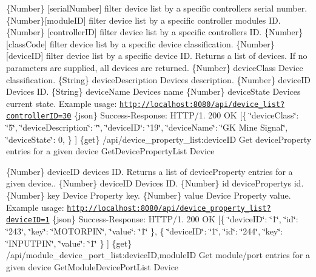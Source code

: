 \{Number\} \mbox{[}serial\+Number\mbox{]} filter device list by a specific controller\textquotesingle{}s serial number.  \{Number\}\mbox{[}module\+ID\mbox{]} filter device list by a specific controller module\textquotesingle{}s ID.  \{Number\} \mbox{[}controller\+ID\mbox{]} filter device list by a specific controller\textquotesingle{}s ID.  \{Number\} \mbox{[}class\+Code\mbox{]} filter device list by a specific device classification.  \{Number\} \mbox{[}device\+ID\mbox{]} filter device list by a specific device ID.  Returns a list of devices. If no parameters are supplied, all devices are returned.  \{Number\} device\+Class Device classification.  \{String\} device\+Description Device\textquotesingle{}s description.  \{Number\} device\+ID Device\textquotesingle{}s ID.  \{String\} device\+Name Device\textquotesingle{}s name  \{Number\} device\+State Device\textquotesingle{}s current state.  Example usage\+: \href{http://localhost:8080/api/device_list?controllerID=30}{\tt http\+://localhost\+:8080/api/device\+\_\+list?controller\+I\+D=30}  \{json\} Success-\/\+Response\+: H\+T\+T\+P/1. 200 OK \mbox{[}\{ \char`\"{}device\+Class\char`\"{}\+: \char`\"{}5\char`\"{}, \char`\"{}device\+Description\char`\"{}\+: \char`\"{}\char`\"{}, \char`\"{}device\+I\+D\char`\"{}\+: \char`\"{}19\char`\"{}, \char`\"{}device\+Name\char`\"{}\+: \char`\"{}\+G\+K Mine Signal\char`\"{}, \char`\"{}device\+State\char`\"{}\+: 0, \} \mbox{]}  \{get\} /api/device\+\_\+property\+\_\+list\+:device\+ID Get device\+Property entries for a given device  Get\+Device\+Property\+List  Device

\{Number\} device\+ID device\textquotesingle{}s ID.  Returns a list of device\+Property entries for a given device..  \{Number\} device\+ID Device\textquotesingle{}s ID.  \{Number\} id device\+Property\textquotesingle{}s id.  \{Number\} key Device Property key.  \{Number\} value Device Property value.  Example usage\+: \href{http://localhost:8080/api/device_property_list?deviceID=1}{\tt http\+://localhost\+:8080/api/device\+\_\+property\+\_\+list?device\+I\+D=1}  \{json\} Success-\/\+Response\+: H\+T\+T\+P/1. 200 OK \mbox{[}\{ \char`\"{}device\+I\+D\char`\"{}\+: \char`\"{}1\char`\"{}, \char`\"{}id\char`\"{}\+: \char`\"{}243\char`\"{}, \char`\"{}key\char`\"{}\+: \char`\"{}\+M\+O\+T\+O\+R\+P\+I\+N\char`\"{}, \char`\"{}value\char`\"{}\+: \char`\"{}1\char`\"{} \}, \{ \char`\"{}device\+I\+D\char`\"{}\+: \char`\"{}1\char`\"{}, \char`\"{}id\char`\"{}\+: \char`\"{}244\char`\"{}, \char`\"{}key\char`\"{}\+: \char`\"{}\+I\+N\+P\+U\+T\+P\+I\+N\char`\"{}, \char`\"{}value\char`\"{}\+: \char`\"{}1\char`\"{} \} \mbox{]}  \{get\} /api/module\+\_\+device\+\_\+port\+\_\+list\+:device\+ID,module\+ID Get module/port entries for a given device  Get\+Module\+Device\+Port\+List  Device


